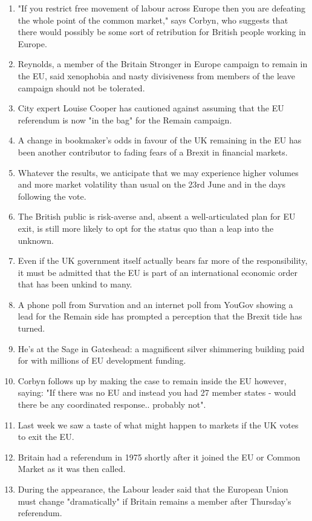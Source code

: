 \documentclass[fleqn,moreauthors,10pt]{ds_report}
\begin{document}
\begin{enumerate}
    \item "If you restrict free movement of labour across Europe then you are defeating the whole point of the common market," says Corbyn, who suggests that there would possibly be some sort of retribution for British people working in Europe.
    \item Reynolds, a member of the Britain Stronger in Europe campaign to remain in the EU, said xenophobia and nasty divisiveness from members of the leave campaign should not be tolerated.
    \item City expert Louise Cooper has cautioned against assuming that the EU referendum is now "in the bag" for the Remain campaign.
    \item A change in bookmaker's odds in favour of the UK remaining in the EU has been another contributor to fading fears of a Brexit in financial markets.
    \item Whatever the results, we anticipate that we may experience higher volumes and more market volatility than usual on the 23rd June and in the days following the vote.
    \item The British public is risk-averse and, absent a well-articulated plan for EU exit, is still more likely to opt for the status quo than a leap into the unknown.
    \item Even if the UK government itself actually bears far more of the responsibility, it must be admitted that the EU is part of an international economic order that has been unkind to many.
    \item A phone poll from Survation and an internet poll from YouGov showing a lead for the Remain side has prompted a perception that the Brexit tide has turned.
    \item He's at the Sage in Gateshead: a magnificent silver shimmering building paid for with millions of  EU	development funding.
    \item Corbyn follows up by making the case to remain inside the EU however, saying: "If there was no EU and instead you had 27 member states - would there be any coordinated response.. probably not".
    \item Last week we saw a taste of what might happen to markets if the UK votes to exit the EU.
    \item Britain had a referendum in 1975 shortly after it joined the EU or Common Market as it was then called.
    \item During the appearance, the Labour leader said that the European Union must change "dramatically" if Britain remains a member after Thursday's referendum.

\end{enumerate}
\end{document}
